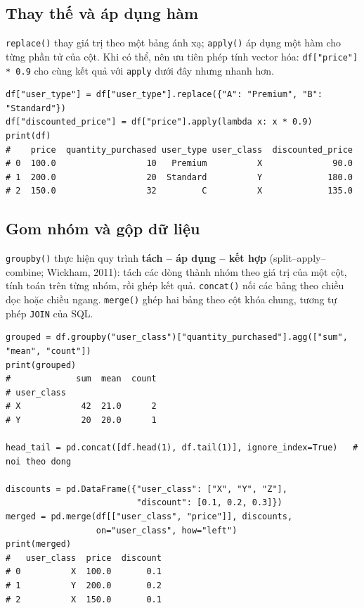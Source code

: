 \subsection{Thay thế và áp dụng hàm}

\texttt{replace()} thay giá trị theo một bảng ánh xạ; \texttt{apply()} áp dụng một hàm cho từng phần tử của cột. Khi có thể, nên ưu tiên phép tính vector hóa: \texttt{df["price"] * 0.9} cho cùng kết quả với \texttt{apply} dưới đây nhưng nhanh hơn.

\begin{lstlisting}[caption={Biến đổi cột bằng replace và apply}]
df["user_type"] = df["user_type"].replace({"A": "Premium", "B": "Standard"})
df["discounted_price"] = df["price"].apply(lambda x: x * 0.9)
print(df)
#    price  quantity_purchased user_type user_class  discounted_price
# 0  100.0                  10   Premium          X              90.0
# 1  200.0                  20  Standard          Y             180.0
# 2  150.0                  32         C          X             135.0
\end{lstlisting}

\subsection{Gom nhóm và gộp dữ liệu}

\texttt{groupby()} thực hiện quy trình \textbf{tách -- áp dụng -- kết hợp} (split--apply--combine; Wickham, 2011): tách các dòng thành nhóm theo giá trị của một cột, tính toán trên từng nhóm, rồi ghép kết quả. \texttt{concat()} nối các bảng theo chiều dọc hoặc chiều ngang. \texttt{merge()} ghép hai bảng theo cột khóa chung, tương tự phép \texttt{JOIN} của SQL.

\begin{lstlisting}[caption={Gom nhóm bằng groupby, gộp bảng bằng concat và merge}]
grouped = df.groupby("user_class")["quantity_purchased"].agg(["sum", "mean", "count"])
print(grouped)
#             sum  mean  count
# user_class
# X            42  21.0      2
# Y            20  20.0      1

head_tail = pd.concat([df.head(1), df.tail(1)], ignore_index=True)   # noi theo dong

discounts = pd.DataFrame({"user_class": ["X", "Y", "Z"],
                          "discount": [0.1, 0.2, 0.3]})
merged = pd.merge(df[["user_class", "price"]], discounts,
                  on="user_class", how="left")
print(merged)
#   user_class  price  discount
# 0          X  100.0       0.1
# 1          Y  200.0       0.2
# 2          X  150.0       0.1
\end{lstlisting}

